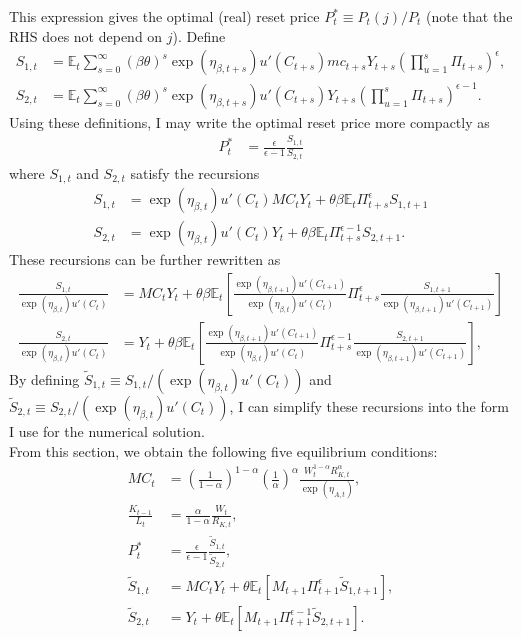 \documentclass[12 pt, oneside]{article}
\theoremstyle{definition}
\theoremstyle{definition}
\theoremstyle{definition}
\newcommand{\E}{\mathbb{E}}
\begin{document}
This expression gives the optimal (real) reset price $P_t^* \equiv P_t(j) / P_t $ (note that the RHS does not depend on $j$).
Define
\begin{align*}
  S_{1, t} & = \E_t\sum_{s = 0}^\infty  (\beta\theta)^s \exp(\eta_{\beta, t + s})u'(C_{t + s}) mc_{t + s}Y_{t + s}\left( \prod_{u = 1}^s\Pi_{t + s}\right)^{\epsilon},\\
  S_{2, t}  & = \E_t\sum_{s = 0}^\infty (\beta\theta)^s \exp(\eta_{\beta, t + s})u'(C_{t + s})Y_{t + s}\left(\prod_{u = 1}^s\Pi_{t + s}\right)^{\epsilon - 1}.
\end{align*}
Using these definitions, I may write the optimal reset price more compactly as
\begin{align*}
  P_t^* & = \frac{\epsilon}{\epsilon - 1}\frac{S_{1, t}}{S_{2, t}}
\end{align*}
where $S_{1, t}$ and $S_{2, t}$ satisfy the recursions
\begin{align*}
  S_{1, t} & = \exp(\eta_{\beta, t})u'(C_t) MC_t Y_t + \theta \beta \E_t\Pi_{t + s}^\epsilon S_{1, t + 1}\\
  S_{2, t} & = \exp(\eta_{\beta, t})u'(C_t) Y_t + \theta \beta \E_t \Pi_{t + s}^{\epsilon - 1}S_{2, t + 1}.
\end{align*}
These recursions can be further rewritten as
\begin{align*}
  \frac{S_{1, t}}{\exp(\eta_{\beta, t})u'(C_t)} & =  MC_t Y_t + \theta \beta \E_t\left[\frac{\exp(\eta_{\beta, t + 1}) u'(C_{t + 1})}{\exp(\eta_{\beta, t}) u'(C_t)}\Pi_{t + s}^\epsilon \frac{S_{1, t + 1}}{\exp(\eta_{\beta, t + 1})u'(C_{t + 1})}\right]\\
  \frac{S_{2, t}}{\exp(\eta_{\beta, t})u'(C_t)} & =  Y_t + \theta \beta \E_t\left[\frac{\exp(\eta_{\beta, t + 1}) u'(C_{t + 1})}{\exp(\eta_{\beta, t}) u'(C_t)}\Pi_{t + s}^{\epsilon - 1} \frac{S_{2, t + 1}}{\exp(\eta_{\beta, t + 1})u'(C_{t + 1})}\right],
\end{align*}
By defining $\tilde{S}_{1, t} \equiv S_{1, t}/ (\exp(\eta_{\beta, t})u'(C_t))$ and $\tilde{S}_{2, t} \equiv S_{2, t}/ (\exp(\eta_{\beta, t})u'(C_t))$, I can simplify these recursions into the form I use for the numerical solution.\\

From this section, we obtain the following five equilibrium conditions:
\begin{align}
  \label{eq:mc soln}
  MC_t & =  \left(\frac{1}{1 - \alpha}\right)^{1 - \alpha}\left(\frac{1}{\alpha}\right)^{\alpha}\frac{W_t^{1 - \alpha}R_{K, t}^{\alpha}}{ \exp(\eta_{A, t})},\\
  \label{eq:optimal capital labor ratio}
  \frac{K_{t - 1}}{L_t} & =\frac{\alpha}{1 - \alpha} \frac{W_t}{R_{K, t}},\\
  \label{eq:real optimal reset price}
  P_t^* & = \frac{\epsilon}{\epsilon - 1}\frac{\tilde{S}_{1, t}}{\tilde{S}_{2, t}},\\
  \label{eq:numerator recursion}
  \tilde{S}_{1, t} & = MC_t Y_t + \theta\E_t[M_{t + 1} \Pi_{t + 1}^\epsilon \tilde{S}_{1, t + 1}],\\
  \label{eq:denominator recursion}
  \tilde{S}_{2, t} & =  Y_t + \theta\E_t[M_{t + 1} \Pi_{t + 1}^{\epsilon - 1} \tilde{S}_{2, t + 1}].
\end{align}
\end{document}
